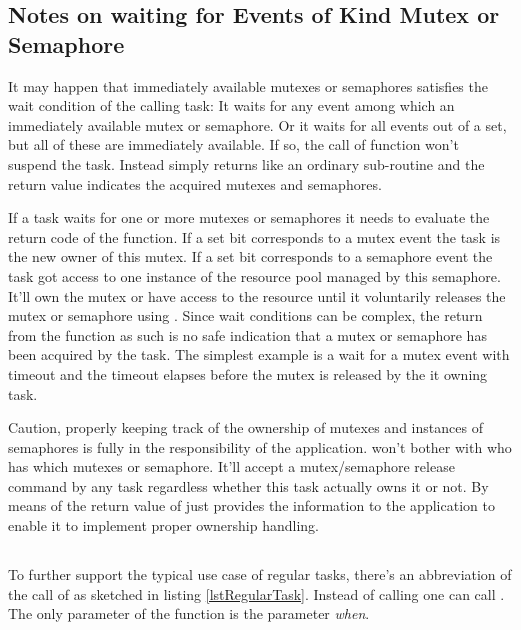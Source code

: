 \subsection{Notes on waiting for Events of Kind Mutex or Semaphore}
\label{secNoteOnWaitingForMutexes}

It may happen that immediately available mutexes or semaphores satisfies
the wait condition of the calling task: It waits for any event among which
an immediately available mutex or semaphore. Or it waits for all events
out of a set, but all of these are immediately available. If so, the call
of function  won't suspend the task. Instead
 simply returns like an ordinary sub-routine and
the return value indicates the acquired mutexes and semaphores.

If a task waits for one or more mutexes or semaphores it needs to evaluate
the return code of the function. If a set bit corresponds to a mutex event
the task is the new owner of this mutex. If a set bit corresponds to a
semaphore event the task got access to one instance of the resource pool
managed by this semaphore. It'll own the mutex or have access to the
resource until it voluntarily releases the mutex or semaphore using
. Since wait conditions can be complex, the return
from the function as such is no safe indication that a mutex or semaphore
has been acquired by the task. The simplest example is a wait for a mutex
event with timeout and the timeout elapses before the mutex is released by
the it owning task.

Caution, properly keeping track of the ownership of mutexes and instances
of semaphores is fully in the responsibility of the application. \rtos{}
won't bother with who has which mutexes or semaphore. It'll accept a
mutex/semaphore release command by any task regardless
whether this task actually owns it or not. By means of the return value of
 \rtos{} just provides the information to the
application to enable it to implement proper ownership handling.


\subsection{}

To further support the typical use case of regular tasks, there's an
abbreviation of the call of  as sketched in
listing \ref{lstRegularTask}. Instead of calling
 one can call
. The only parameter of the
function is the parameter \emph{when}.

